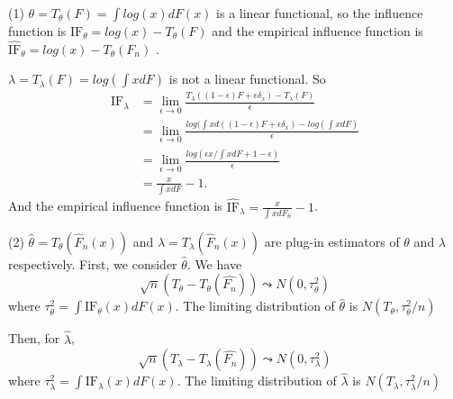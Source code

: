 \begin{solution}
    (1) $\theta = T_\theta(F) = \int log(x) d F(x)$ is a linear functional, so the influence function is $\text{IF}_\theta = log(x) - T_\theta(F)$ and the empirical influence function is $\widehat{\text{IF}}_\theta = log(x) - T_\theta(F_n)$ .

    $\lambda = T_\lambda(F) = log(\int x dF)$ is not a linear functional. So 
    \begin{equation*}
        \begin{split}
            \text{IF}_\lambda & = \lim_{\epsilon\to0} \frac{T_\lambda((1-\epsilon)F + \epsilon \delta_x) - T_\lambda(F)}{\epsilon} \\
            & = \lim_{\epsilon\to0}  \frac{log(\int x d ((1-\epsilon)F + \epsilon \delta_x) - log(\int x dF)}{\epsilon} \\
            & = \lim_{\epsilon\to0}  \frac{log \left( \epsilon  x /\int x dF + 1-\epsilon \right)}{\epsilon} \\
            & = \frac{x}{\int x dF} - 1 .
        \end{split}
    \end{equation*}
    And the empirical influence function is $\widehat{\text{IF}}_\lambda = \frac{x}{\int x d F_n} - 1$.

    (2) $\hat{\theta} = T_\theta(\hat{F}_n(x))$ and $\hat{\lambda} = T_\lambda(\hat{F}_n(x))$ are plug-in estimators of $\theta$ and $\lambda$ respectively. 
    First, we consider $\hat{\theta}$. 
    We have
    \begin{equation*}
        \sqrt{n} (T_\theta - T_\theta(\hat{F_n})) \leadsto N(0, \tau_\theta^2)
    \end{equation*}
    where $\tau_\theta^2 = \int \text{IF}_\theta(x) d F(x)$. 
    The limiting distribution of $\hat{\theta}$ is $N(T_\theta, \tau_\theta^2/n)$

    Then, for $\hat{\lambda}$,
    \begin{equation*}
        \sqrt{n} (T_\lambda - T_\lambda(\hat{F_n})) \leadsto N(0, \tau_\lambda^2)
    \end{equation*}
    where $\tau_\lambda^2 = \int \text{IF}_\lambda(x) d F(x)$. 
    The limiting distribution of $\hat{\lambda}$ is $N(T_\lambda, \tau_\lambda^2/n)$
    

\end{solution}
